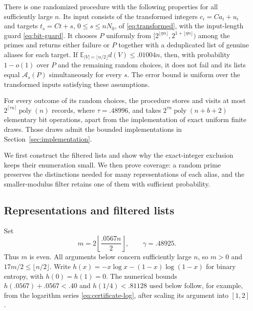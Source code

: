 \begin{theorem}
\label{thm:aliases}
There is one randomized procedure with the following properties for all
sufficiently large $n$.  Its input consists of the transformed integers
$c_i=Ca_i+u_i$ and targets $t_s=Ct+s$, $0\le s\le nN_0$, of
\eqref{eq:transformed}, with the input-length guard \eqref{eq:bit-guard}.
It chooses $P$ uniformly from
$[2^{\lfloor\eta n\rfloor},2^{1+\lfloor\eta n\rfloor})$
among the primes and returns either failure or $P$ together with a
deduplicated list of genuine aliases for each target.
If $\mathbb E_{|V|=\lfloor n/2\rfloor}d(V)\le .01004n$, then, with
probability $1-o(1)$ over $P$ and the remaining random choices, it does not
fail and its lists equal
$\mathcal A_s(P)$ simultaneously for every $s$.  The error bound is uniform
over the transformed inputs satisfying these assumptions.

For every outcome of its random choices, the procedure stores and visits at
most $2^{\lceil\tau n\rceil}\operatorname{poly}(n)$ records, where
$\tau=.48996$, and takes
$2^{\tau n}\operatorname{poly}(n+b+2)$ elementary bit operations, apart
from the implementation of exact uniform finite draws.  Those draws admit
the bounded implementations in Section~\ref{sec:implementation}.
\end{theorem}

We first construct the filtered lists and show why the exact-integer
exclusion keeps their enumeration small.  We then prove coverage: a
random prime preserves the distinctions needed for many representations
of each alias, and the smaller-modulus filter retains one of them with
sufficient probability.

\subsection{Representations and filtered lists}

Set
\begin{equation}
 m=2\left\lfloor\frac{.0567n}{2}\right\rfloor,
 \qquad \gamma=.48925.
 \label{eq:alias-parameters}
\end{equation}
Thus $m$ is even.  All arguments below concern sufficiently large $n$,
so $m>0$ and $17m/2\le\lfloor n/2\rfloor$.
Write $h(x)=-x\log x-(1-x)\log(1-x)$ for binary entropy, with
$h(0)=h(1)=0$.
The numerical bounds $h(.0567)+.0567<.40$ and $h(1/4)<.81128$ used
below follow, for example, from the logarithm series
\eqref{eq:certificate-log}, after scaling its argument into $[1,2]$.

